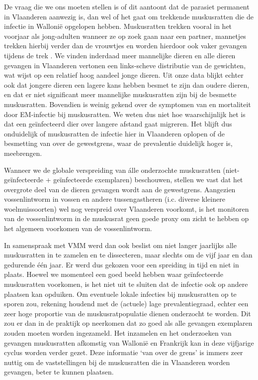 \documentclass[twoside]{extreport}
\begin{document}
De vraag die we ons moeten stellen is of dit aantoont dat de parasiet
permanent in Vlaanderen aanwezig is, dan wel of het gaat om trekkende
muskusratten die de infectie in Wallonië opgelopen hebben. Muskusratten
trekken vooral in het voorjaar als jong-adulten wanneer ze op zoek gaan
naar een partner, mannetjes trekken hierbij verder dan de vrouwtjes en
worden hierdoor ook vaker gevangen tijdens de trek
\citep{plug1988handboek}. We vinden inderdaad meer mannelijke dieren en
alle dieren gevangen in Vlaanderen vertonen een links-scheve distributie
van de gewichten, wat wijst op een relatief hoog aandeel jonge dieren.
Uit onze data blijkt echter ook dat jongere dieren een lagere kans
hebben besmet te zijn dan oudere dieren, en dat er niet significant meer
mannelijke muskusratten zijn bij de besmette muskusratten. Bovendien is
weinig gekend over de symptomen van en mortaliteit door EM-infectie bij
muskusratten. We weten dus niet hoe waarschijnlijk het is dat een
geïnfecteerd dier over langere afstand gaat migreren. Het blijft dus
onduidelijk of muskusratten de infectie hier in Vlaanderen oplopen of de
besmetting van over de gewestgrens, waar de prevalentie duidelijk hoger
is, meebrengen.

Wanneer we de globale verspreiding van álle onderzochte muskusratten
(niet-geïnfecteerde + geïnfecteerde exemplaren) beschouwen, stellen we
vast dat het overgrote deel van de dieren gevangen wordt aan de
gewestgrens. Aangezien vossenlintworm in vossen en andere
tussengastheren (i.c. diverse kleinere woelmuissoorten) wel nog
verspreid over Vlaanderen voorkomt, is het monitoren van de
vossenlintworm in de muskusrat geen goede proxy om zicht te hebben op
het algemeen voorkomen van de vossenlintworm.

In samenspraak met VMM werd dan ook beslist om niet langer jaarlijks
alle muskusratten in te zamelen en te dissecteren, maar slechts om de
vijf jaar en dan gedurende één jaar. Er werd dus gekozen voor een
spreiding in tijd en niet in plaats. Hoewel we momenteel een goed beeld
hebben waar geïnfecteerde muskusratten voorkomen, is het niet uit te
sluiten dat de infectie ook op andere plaatsen kan opduiken. Om
eventuele lokale infecties bij muskusratten op te sporen zou, rekening
houdend met de (actuele) lage prevalentiegraad, echter een zeer hoge
proportie van de muskusratpopulatie dienen onderzocht te worden. Dit zou
er dan in de praktijk op neerkomen dat zo goed als alle gevangen
exemplaren zouden moeten worden ingezameld. Het inzamelen en het
onderzoeken van gevangen muskusratten afkomstig van Wallonië en
Frankrijk kan in deze vijfjarige cyclus worden verder gezet. Deze
informatie `van over de grens' is immers zeer nuttig om de
vaststellingen bij de muskusratten die in Vlaanderen worden gevangen,
beter te kunnen plaatsen.
\end{document}

